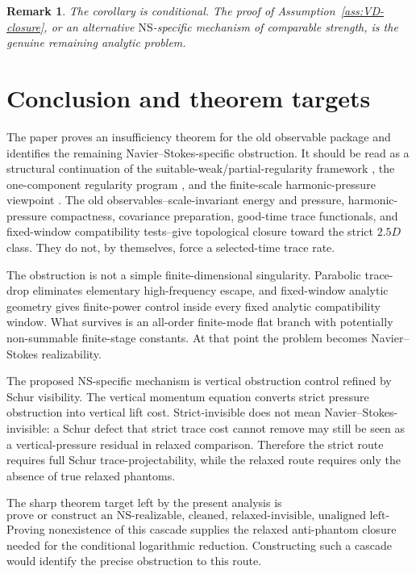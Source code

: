 \documentclass[11pt]{article}
\numberwithin{equation}{section}
\newtheorem{remark}[theorem]{Remark}
\newcommand{\NS}{\mathrm{NS}}
\begin{document}
\begin{remark}
The corollary is conditional.  The proof of Assumption~\ref{ass:VD-closure}, or an alternative \(\NS\)-specific mechanism of comparable strength, is the genuine remaining analytic problem.
\end{remark}


\section{Conclusion and theorem targets}

The paper proves an insufficiency theorem for the old observable package and identifies the remaining Navier--Stokes-specific obstruction.  It should be read as a structural continuation of the suitable-weak/partial-regularity framework \cite{CKN1982,Seregin2015}, the one-component regularity program \cite{KukavicaZiane2006,CheminZhang2016,HanLeiLiZhao2019,KangNguyen2023}, and the finite-scale harmonic-pressure viewpoint \cite{Yu2026HarmonicPressure}. The old observables--scale-invariant energy and pressure, harmonic-pressure compactness, covariance preparation, good-time trace functionals, and fixed-window compatibility tests--give topological closure toward the strict \(2.5D\) class. They do not, by themselves, force a selected-time trace rate.

The obstruction is not a simple finite-dimensional singularity. Parabolic trace-drop eliminates elementary high-frequency escape, and fixed-window analytic geometry gives finite-power control inside every fixed analytic compatibility window. What survives is an all-order finite-mode flat branch with potentially non-summable finite-stage constants. At that point the problem becomes Navier--Stokes realizability.

The proposed NS-specific mechanism is vertical obstruction control refined by Schur visibility. The vertical momentum equation converts strict pressure obstruction into vertical lift cost. Strict-invisible does not mean Navier--Stokes-invisible: a Schur defect that strict trace cost cannot remove may still be seen as a vertical-pressure residual in relaxed comparison. Therefore the strict route requires full Schur trace-projectability, while the relaxed route requires only the absence of true relaxed phantoms.

The sharp theorem target left by the present analysis is
\[
\boxed{\text{prove or construct an NS-realizable, cleaned, relaxed-invisible, unaligned left-singular cascade.}}
\]
Proving nonexistence of this cascade supplies the relaxed anti-phantom closure needed for the conditional logarithmic reduction. Constructing such a cascade would identify the precise obstruction to this route.
\end{document}
